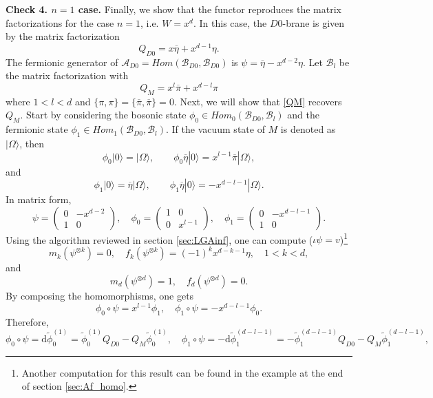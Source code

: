 \documentclass[a4paper,11pt]{article}
\def\cA{\mathcal{A}}
\numberwithin{equation}{section}
\begin{document}
{\bf Check 4. $n=1$ case.} Finally, we show that the functor reproduces the 
matrix factorizations for the 
case $n=1$, i.e. $W = x^d$. In this case, the $D0$-brane 
is 
given by the matrix factorization
\begin{equation}
Q_{D0} = x \overline{\eta} + x^{d-1} \eta.
\end{equation}
The fermionic generator of $\cA_{D0} = Hom(\mathcal{B}_{D0},\mathcal{B}_{D0})$ 
is $\psi = \overline{\eta} - x^{d-2} \eta$. Let $\mathcal{B}_l$ be the matrix 
factorization with
\begin{equation}\label{MFmm}
Q_M = x^l \overline{\pi} + x^{d-l} \pi
\end{equation}
where $1<l<d$ and $\{\pi,\pi\} = \{ \overline{\pi}, \overline{\pi} \} = 0$. 
Next, we will show that \eqref{QM} recovers $Q_{M}$. Start by considering the 
bosonic state $\phi_0 \in Hom_0(\mathcal{B}_{D0},\mathcal{B}_l)$ and the 
fermionic state $\phi_1 \in Hom_1(\mathcal{B}_{D0},\mathcal{B}_l)$. If the 
vacuum state of $M$ is denoted as $|\Omega \rangle$, then
\[
\phi_0 |0\rangle = |\Omega \rangle, \quad \quad \phi_0 \overline{\eta}|0\rangle 
= x^{l-1} \overline{\pi} |\Omega \rangle,
\]
and
\[
\phi_1 |0\rangle = \overline{\eta} |\Omega \rangle, \quad \quad \phi_1 
\overline{\eta}|0\rangle = -x^{d-l-1} |\Omega \rangle.
\]
In matrix form,
\[
\psi = \left( \begin{array}{cc} 0 & -x^{d-2} \\ 1 & 0 \end{array} \right),\quad
\phi_0 = \left( \begin{array}{cc} 1 & 0 \\ 0 & x^{l-1} \end{array} \right),\quad
\phi_1 = \left( \begin{array}{cc} 0 & -x^{d-l-1} \\ 1 & 0 \end{array} \right).
\]
Using the algorithm reviewed in section \ref{sec:LGAinf}, one can compute 
($\iota \psi = v$)\footnote{Another computation for this result can be found 
in 
the example at the end of section \ref{sec:Af_homo}.}
\[
m_k(\psi^{\otimes k}) = 0,\quad f_k(\psi^{\otimes k}) = (-1)^k x^{d-k-1} 
\eta,\quad 
1<k<d,
\] 
and
\[
m_d(\psi^{\otimes d}) = 1,\quad f_d(\psi^{\otimes d}) = 0.
\]
By composing the homomorphisms, one gets
\[
\phi_0 \circ \psi = x^{l-1} \phi_1,\quad \phi_1 \circ \psi = -x^{d-l-1} \phi_0.
\]
Therefore,
\[
\phi_0 \circ \psi = \mathrm{d} \tilde{\phi}^{(1)}_0 = \tilde{\phi}^{(1)}_0 
Q_{D0} - 
Q_M \tilde{\phi}^{(1)}_0,\quad \phi_1 \circ \psi = -\mathrm{d} 
\tilde{\phi}^{(d-l-1)}_1 = -\tilde{\phi}^{(d-l-1)}_1 Q_{D0} - Q_M 
\tilde{\phi}^{(d-l-1)}_1,
\]
\end{document}
